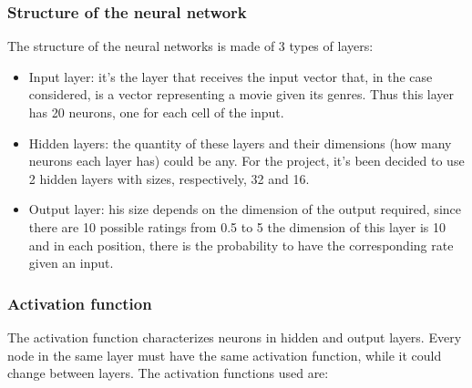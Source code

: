 \documentclass{article}
\begin{document}
\subsubsection{Structure of the neural network}

The structure of the neural networks is made of 3 types of layers:
\begin{itemize}
    \item Input layer: it's the layer that receives the input vector that, in the case considered, is a vector representing a movie given its genres. Thus this layer has 20 neurons, one for each cell of the input.
    \item Hidden layers: the quantity of these layers and their dimensions (how many neurons each layer has) could be any. For the project, it's been decided to use 2 hidden layers with sizes, respectively, 32 and 16.
    \item Output layer: his size depends on the dimension of the output required, since there are 10 possible ratings from 0.5 to 5 the dimension of this layer is 10 and in each position, there is the probability to have the corresponding rate given an input.
\end{itemize}

\subsubsection{Activation function}
The activation function characterizes neurons in hidden and output layers. Every node in the same layer must have the same activation function, while it could change between layers.
The activation functions used are:
\end{document}
